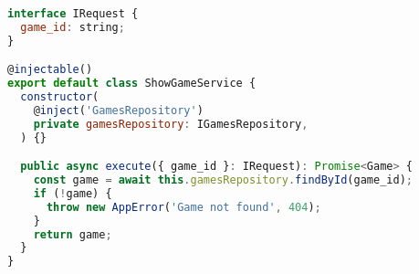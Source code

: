 \begin{lstlisting}[language=JavaScript, caption={Implementação correta do SRP},captionpos=b, label=alg:showgameservice]
interface IRequest {
  game_id: string;
}

@injectable()
export default class ShowGameService {
  constructor(
    @inject('GamesRepository')
    private gamesRepository: IGamesRepository,
  ) {}

  public async execute({ game_id }: IRequest): Promise<Game> {
    const game = await this.gamesRepository.findById(game_id);
    if (!game) {
      throw new AppError('Game not found', 404);
    }
    return game;
  }
}
\end{lstlisting}